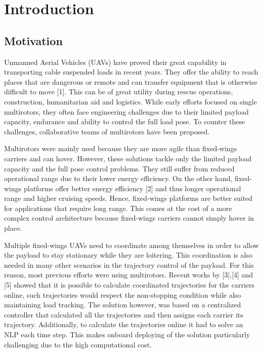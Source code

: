 \chapter{Introduction}

\section{Motivation}

Unmanned Aerial Vehicles (UAVs) have proved their great capability in
transporting cable suspended loads in recent years. They offer the ability
to reach places that are dangerous or remote and can transfer equipment
that is otherwise difficult to move [1]. This can be of great utility
during rescue operations, construction, humanitarian aid and logistics.
While early efforts focused on single multirotors, they often face
engineering challenges due to their limited payload capacity, endurance and
ability to control the full load pose. To counter these challenges,
collaborative teams of multirotors have been proposed.

Multirotors were mainly used because they are more agile than fixed-wings
carriers and can hover. However, these solutions tackle only the limited
payload capacity and the full pose control problems. They still suffer
from reduced operational range due to their lower energy efficiency. On
the other hand, fixed-wings platforms offer better energy efficiency [2]
and thus longer operational range and higher cruising speeds. Hence,
fixed-wings platforms are better suited for applications that require long
range. This comes at the cost of a more complex control architecture
because fixed-wings carriers cannot simply hover in place.

Multiple fixed-wings UAVs need to coordinate among themselves in order to
allow the payload to stay stationary while they are loitering. This
coordination is also needed in many other scenarios in the trajectory
control of the payload. For this reason, most previous efforts were using
multirotors. Recent works by [3],[4] and [5] showed that it is possible to
calculate coordinated trajectories for the carriers online, such trajectories
would respect the non-stopping condition while also maintaining load tracking. 
The solution however, was based
on a centralized controller that calculated all the trajectories and then
assigns each carrier its trajectory. Additionally, to calculate the
trajectories online it had to solve an NLP each time step. This makes
onboard deploying of the solution particularly challenging due to the high
computational cost.

